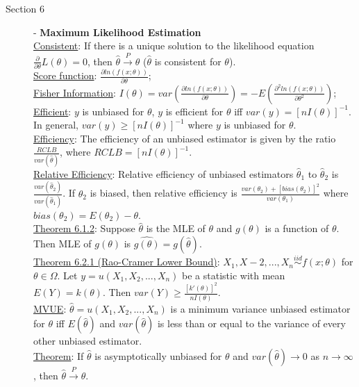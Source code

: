 \documentclass[10pt,landscape]{article}
\begin{document}
\begin{multicols}{3}
   	\begin{description}  %
   		\item[Section 6] - \textbf{Maximum Likelihood Estimation }\\
   		\underline{Consistent}: If there is a unique solution to the likelihood equation $\frac{\partial}{\partial \theta}L(\theta) = 0$, then $\hat{\theta} \overset{P}{\rightarrow} \theta	$ ($\hat{\theta}$ is consistent for $\theta$).\\
   		\underline{Score function}: $\frac{\partial ln(f(x; \theta))}{\partial \theta}$;\\
   		\underline{Fisher Information}: $I(\theta)= var(\frac{\partial ln(f(x; \theta))}{\partial \theta}) = -E(\frac{\partial^2 ln(f(x; \theta))}{\partial \theta^2})$;\\
   		\underline{Efficient}: $y$ is unbiased for $\theta$, $y$ is efficient for $\theta$ iff $var(y) = [nI(\theta)]^{-1}$. In general, $var(y) \geq [nI(\theta)]^{-1}$ where $y$ is unbiased for $\theta$. \\
   		\underline{Efficiency}: The efficiency of an unbiased estimator is given by the ratio $\frac{RCLB}{var(\hat{\theta})}$, where $RCLB = [nI(\theta)]^{-1}$. \\
   		\underline{Relative Efficiency}: Relative efficiency of unbiased estimators $\hat{\theta}_1$ to $\hat{\theta}_2$ is $\frac{var(\hat{\theta}_2)}{var(\hat{\theta}_1)}$. If $\theta_2$ is biased, then relative efficiency is $\frac{var(\theta_2) + [bias(\theta_2)]^2}{var(\theta_1)}$ where $bias(\theta_2) = E(\theta_2) - \theta$.\\
   		\underline{Theorem 6.1.2}: Suppose $\hat{\theta}$ is the MLE of $\theta$ and $g(\theta)$ is a function of $\theta$. Then MLE of $g(\theta)$ is $\hat{g(\theta)} = g(\hat{\theta})$. \\
   		\underline{Theorem 6.2.1 (Rao-Cramer Lower Bound)}: $X_1, X-2, ..., X_n \overset{iid}{\sim} f(x; \theta)$ for $\theta \in \Omega$. Let $y = u(X_1,X_2, ..., X_n)$ be a statistic with mean $E(Y) = k(\theta)$. Then $var(Y) \geq \frac{[k'(\theta)]^2}{nI(\theta)}$. \\
   		\underline{MVUE}: $\hat{\theta} = u(X_1, X_2, ..., X_n)$ is a minimum variance unbiased estimator for $\theta$  iff $E(\hat{\theta})$ and $var(\hat{\theta})$ is less than or equal to the variance of every other unbiased  estimator. \\
   		\underline{Theorem}: If $\hat{\theta}$ is asymptotically unbiased for $\theta$ and $var(\hat{\theta}) \rightarrow 0$ as $n\rightarrow \infty$, then $\hat{\theta} \overset{P}{\rightarrow} \theta$. 
	\end{description}      


\end{multicols}
\end{document}

